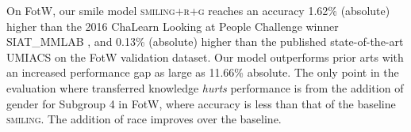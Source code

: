 \documentclass{article}
\begin{document}

On FotW, our smile model \textsc{smiling+r+g} reaches an accuracy 1.62\% (absolute) higher than the 2016 ChaLearn Looking at People Challenge winner \textsc{SIAT\_MMLAB} \cite{zhangetal2016gendersmile}, and 0.13\% (absolute) higher than the published state-of-the-art \textsc{UMIACS} \cite{ranjan2017smilingbestfotw} on the FotW validation dataset. %
Our model outperforms prior arts \cite{deepbe2016,uricar2016,Ehrlich_2016_CVPR_Workshops} with an increased performance gap as large as 11.66\% absolute.  The only point in the evaluation where transferred knowledge {\it hurts} performance is from the addition of gender for Subgroup 4 in FotW, where accuracy is less than that of the baseline \textsc{smiling}. The addition of race improves over the baseline.\vspace{-.2em}
\end{document}
